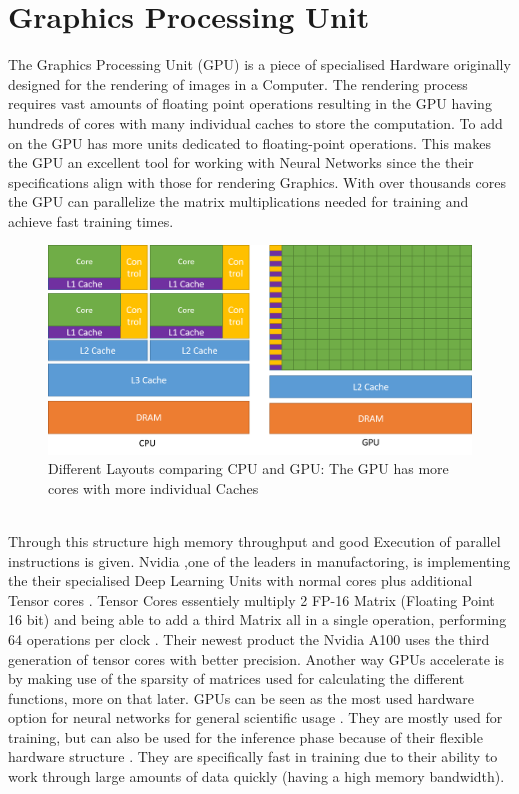 \documentclass[conference]{IEEEtran}
\begin{document}
\section{Graphics Processing Unit}
The Graphics Processing Unit (GPU) is a piece of specialised Hardware originally designed for the rendering of images in a Computer. The rendering process requires vast amounts of floating point operations resulting in the GPU having hundreds of cores with many individual caches to store the computation. To add on the GPU has more units dedicated to floating-point operations. This makes the GPU an excellent tool for working with Neural Networks since the their specifications align with those for rendering Graphics. With over thousands cores the GPU can parallelize the matrix multiplications needed for training and achieve fast training times. 
\begin{figure}[h]
	\caption{Different Layouts comparing CPU and GPU: The GPU has more cores with more individual Caches \cite{intelpic_comparison}}
	\centering
	\includegraphics[width=\linewidth]{pictures/intel_comparison.png}
\end{figure}
\\
Through this structure high memory throughput and good Execution of parallel instructions is given. Nvidia ,one of the leaders in manufactoring, is implementing the their specialised Deep Learning Units with normal cores plus additional Tensor cores \cite{nvidiav100}. Tensor Cores essentiely multiply 2 FP-16 Matrix (Floating Point 16 bit) and being able to add a third Matrix all in a single operation, performing 64 operations per clock \cite{tensorcores}. Their newest product the Nvidia A100 uses the third generation of tensor cores with better precision.
Another way GPUs accelerate is by making use of the sparsity of matrices used for calculating the different functions, more on that later.
GPUs can be seen as the most used hardware option for neural networks for general scientific usage \cite{mostusedgpu}. They are mostly used for training, but can also be used for the inference phase because of their flexible hardware structure \cite{capra2020updated}. They are specifically fast in training due to their ability to work through large amounts of data quickly (having a high memory bandwidth).
\\
\end{document}

